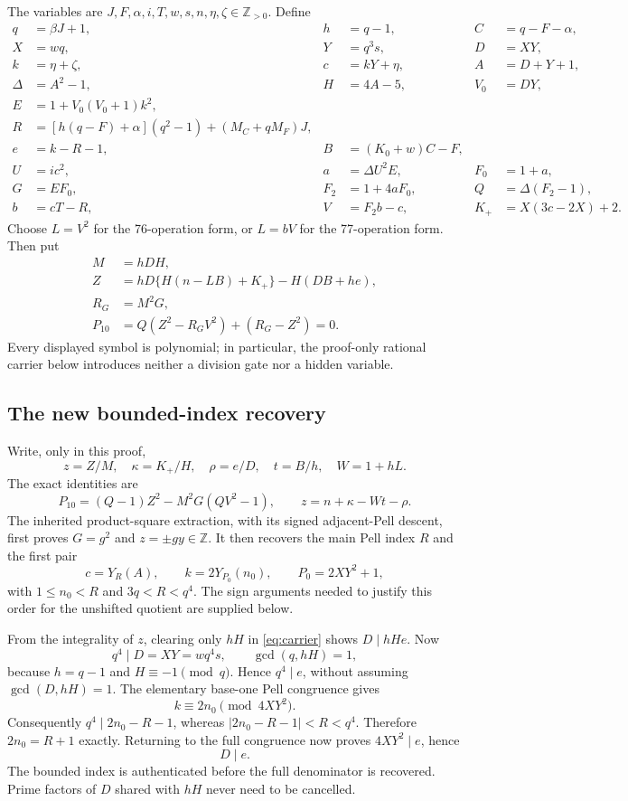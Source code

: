 \documentclass[11pt,letterpaper]{article}
\theoremstyle{remark}\newtheorem{remark}[theorem]{Remark}
\newcommand{\Z}{\mathbb Z}
\newcommand{\Pos}{\mathbb Z_{>0}}
\begin{document}
The variables are $J,F,\alpha,i,T,w,s,n,\eta,\zeta\in\Pos$.
Define
\begin{align*}
q&=\beta J+1,& h&=q-1,& C&=q-F-\alpha,\\
X&=wq,& Y&=q^3s,& D&=XY,\\
k&=\eta+\zeta,& c&=kY+\eta,& A&=D+Y+1,\\
\Delta&=A^2-1,& H&=4A-5,& V_0&=DY,\\
E&=1+V_0(V_0+1)k^2,\\
R&=[h(q-F)+\alpha](q^2-1)+(M_C+qM_F)J,\\
e&=k-R-1,& B&=(K_0+w)C-F,\\
U&=ic^2,& a&=\Delta U^2E,& F_0&=1+a,\\
G&=EF_0,& F_2&=1+4aF_0,& Q&=\Delta(F_2-1),\\
b&=cT-R,& V&=F_2b-c,& K_+&=X(3c-2X)+2.
\end{align*}
Choose $L=V^2$ for the 76-operation form, or $L=bV$ for the
77-operation form. Then put
\begin{align*}
M&=hDH,\\
Z&=hD\{H(n-LB)+K_+\}-H(DB+he),\\
R_G&=M^2G,\\
\boxed{P_{10}}&\boxed{=Q(Z^2-R_GV^2)+(R_G-Z^2)=0.}
\end{align*}
Every displayed symbol is polynomial; in particular, the proof-only rational
carrier below introduces neither a division gate nor a hidden variable.

\subsection{The new bounded-index recovery}

Write, only in this proof,
\[
z=Z/M,\quad \kappa=K_+/H,\quad \rho=e/D,\quad t=B/h,\quad W=1+hL.
\]
The exact identities are
\begin{equation}\label{eq:carrier}
P_{10}=(Q-1)Z^2-M^2G(QV^2-1),\qquad
z=n+\kappa-Wt-\rho.
\end{equation}
The inherited product-square extraction, with its signed adjacent-Pell
descent, first proves $G=g^2$ and $z=\pm gy\in\Z$.
It then recovers the main Pell index $R$ and the first pair
\[
c=Y_R(A),\qquad k=2Y_{P_0}(n_0),\qquad P_0=2XY^2+1,
\]
with $1\le n_0<R$ and $3q<R<q^4$. The sign arguments needed to justify
this order for the unshifted quotient are supplied below.

From the integrality of $z$, clearing only $hH$ in \eqref{eq:carrier}
shows $D\mid hHe$. Now
\[
q^4\mid D=XY=wq^4s,\qquad \gcd(q,hH)=1,
\]
because $h=q-1$ and $H\equiv-1\pmod q$.
Hence $q^4\mid e$, without assuming $\gcd(D,hH)=1$.
The elementary base-one Pell congruence gives
\[
k\equiv2n_0\pmod{4XY^2}.
\]
Consequently $q^4\mid 2n_0-R-1$, whereas
$|2n_0-R-1|<R<q^4$. Therefore $2n_0=R+1$ exactly.
Returning to the full congruence now proves $4XY^2\mid e$, hence
\begin{equation}\label{eq:recoverD}
D\mid e.
\end{equation}
The bounded index is authenticated before the full denominator is recovered.
Prime factors of $D$ shared with $hH$ never need to be cancelled.
\end{document}
